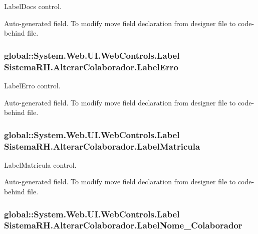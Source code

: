 LabelDocs control. 

Auto-\/generated field. To modify move field declaration from designer file to code-\/behind file. \hypertarget{class_sistema_r_h_1_1_alterar_colaborador_a6af8dd7667cdcbb7f618ae937dc26213}{
\subsubsection[{LabelErro}]{\setlength{\rightskip}{0pt plus 5cm}global::System.Web.UI.WebControls.Label {\bf SistemaRH.AlterarColaborador.LabelErro}}}
\label{class_sistema_r_h_1_1_alterar_colaborador_a6af8dd7667cdcbb7f618ae937dc26213}


LabelErro control. 

Auto-\/generated field. To modify move field declaration from designer file to code-\/behind file. \hypertarget{class_sistema_r_h_1_1_alterar_colaborador_a4f9a57f4da880dcfc401dfe6a31faee2}{
\subsubsection[{LabelMatricula}]{\setlength{\rightskip}{0pt plus 5cm}global::System.Web.UI.WebControls.Label {\bf SistemaRH.AlterarColaborador.LabelMatricula}}}
\label{class_sistema_r_h_1_1_alterar_colaborador_a4f9a57f4da880dcfc401dfe6a31faee2}


LabelMatricula control. 

Auto-\/generated field. To modify move field declaration from designer file to code-\/behind file. \hypertarget{class_sistema_r_h_1_1_alterar_colaborador_a8c051c87f104893658f0c2748dafbe1a}{
\subsubsection[{LabelNome\_\-Colaborador}]{\setlength{\rightskip}{0pt plus 5cm}global::System.Web.UI.WebControls.Label {\bf SistemaRH.AlterarColaborador.LabelNome\_\-Colaborador}}}
\label{class_sistema_r_h_1_1_alterar_colaborador_a8c051c87f104893658f0c2748dafbe1a}


